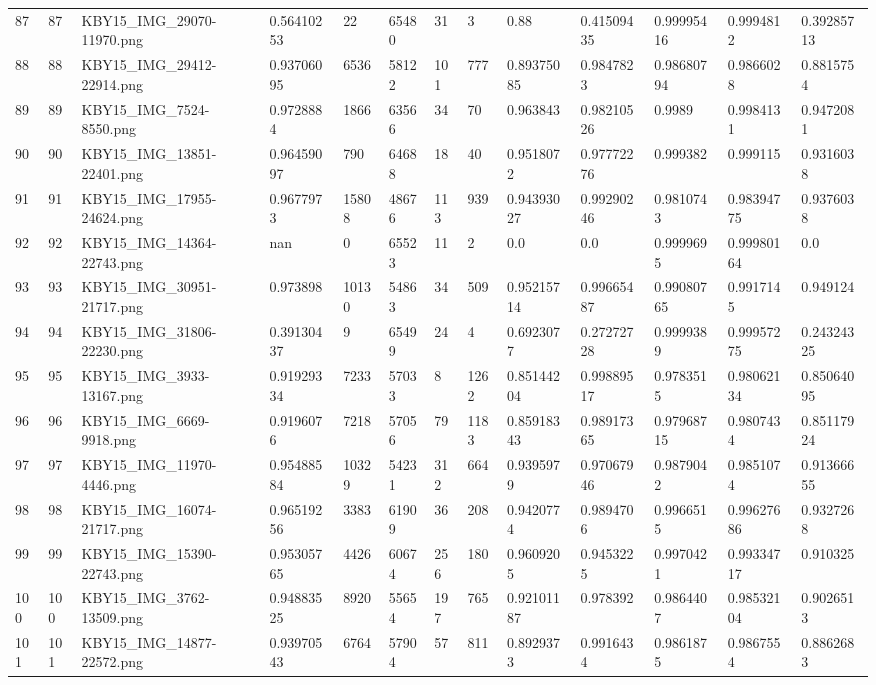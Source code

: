 \documentclass[11pt, a4paper, twoside]{report}
\begin{document}
\begin{longtable}[c]{@{}lllllllllllll@{}}
87 & 87 & KBY15\_IMG\_29070-11970.png & 0.56410253 & 22 & 65480 & 31 & 3 & 0.88 & 0.41509435 & 0.99995416 & 0.9994812 & 0.39285713 \\
88 & 88 & KBY15\_IMG\_29412-22914.png & 0.93706095 & 6536 & 58122 & 101 & 777 & 0.89375085 & 0.9847823 & 0.98680794 & 0.9866028 & 0.8815754 \\
89 & 89 & KBY15\_IMG\_7524-8550.png & 0.9728884 & 1866 & 63566 & 34 & 70 & 0.963843 & 0.98210526 & 0.9989 & 0.9984131 & 0.9472081 \\
90 & 90 & KBY15\_IMG\_13851-22401.png & 0.96459097 & 790 & 64688 & 18 & 40 & 0.9518072 & 0.97772276 & 0.999382 & 0.999115 & 0.9316038 \\
91 & 91 & KBY15\_IMG\_17955-24624.png & 0.9677973 & 15808 & 48676 & 113 & 939 & 0.94393027 & 0.99290246 & 0.9810743 & 0.98394775 & 0.9376038 \\
92 & 92 & KBY15\_IMG\_14364-22743.png & nan & 0 & 65523 & 11 & 2 & 0.0 & 0.0 & 0.9999695 & 0.99980164 & 0.0 \\
93 & 93 & KBY15\_IMG\_30951-21717.png & 0.973898 & 10130 & 54863 & 34 & 509 & 0.95215714 & 0.99665487 & 0.99080765 & 0.9917145 & 0.949124 \\
94 & 94 & KBY15\_IMG\_31806-22230.png & 0.39130437 & 9 & 65499 & 24 & 4 & 0.6923077 & 0.27272728 & 0.9999389 & 0.99957275 & 0.24324325 \\
95 & 95 & KBY15\_IMG\_3933-13167.png & 0.91929334 & 7233 & 57033 & 8 & 1262 & 0.85144204 & 0.99889517 & 0.9783515 & 0.98062134 & 0.85064095 \\
96 & 96 & KBY15\_IMG\_6669-9918.png & 0.9196076 & 7218 & 57056 & 79 & 1183 & 0.85918343 & 0.98917365 & 0.97968715 & 0.9807434 & 0.85117924 \\
97 & 97 & KBY15\_IMG\_11970-4446.png & 0.95488584 & 10329 & 54231 & 312 & 664 & 0.9395979 & 0.97067946 & 0.9879042 & 0.9851074 & 0.91366655 \\
98 & 98 & KBY15\_IMG\_16074-21717.png & 0.96519256 & 3383 & 61909 & 36 & 208 & 0.9420774 & 0.9894706 & 0.9966515 & 0.99627686 & 0.9327268 \\
99 & 99 & KBY15\_IMG\_15390-22743.png & 0.95305765 & 4426 & 60674 & 256 & 180 & 0.9609205 & 0.9453225 & 0.9970421 & 0.99334717 & 0.910325 \\
100 & 100 & KBY15\_IMG\_3762-13509.png & 0.94883525 & 8920 & 55654 & 197 & 765 & 0.92101187 & 0.978392 & 0.9864407 & 0.98532104 & 0.9026513 \\
101 & 101 & KBY15\_IMG\_14877-22572.png & 0.93970543 & 6764 & 57904 & 57 & 811 & 0.8929373 & 0.9916434 & 0.9861875 & 0.9867554 & 0.8862683 \\

\end{longtable}
\end{document}
